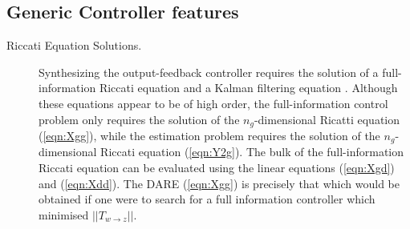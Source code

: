 \documentclass[a4paper,12pt]{article}
\theoremstyle{remark}
\newcommand{\nrm}[1]{\left|\left| #1 \right|\right|}
\begin{document}
\subsection{Generic Controller features} \label{generic:features}
\begin{description}
\item[Riccati Equation Solutions.] Synthesizing the output-feedback controller requires the solution of a full-information Riccati equation and a Kalman filtering equation \cite{LimebeerGreen,ZDG}. Although these equations appear to be of high order, the full-information control problem only requires the solution of the $n_g$-dimensional Ricatti equation (\ref{eqn:Xgg}), while the estimation problem requires the solution of the $n_g$-dimensional Riccati equation (\ref{eqn:Y2g}). The bulk of the full-information Riccati equation can be evaluated using the linear equations (\ref{eqn:Xgd}) and (\ref{eqn:Xdd}). The DARE (\ref{eqn:Xgg}) is precisely that which would be obtained if one were to search for a full information controller which minimised $\nrm{T_{w\rightarrow z}}$.


\end{description}
\end{document}
